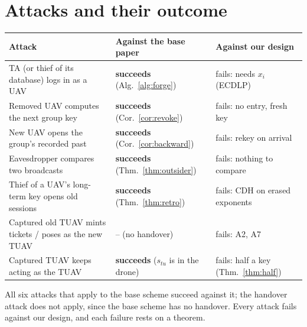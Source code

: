 \section{Attacks and their outcome}
\begin{center}
\small
\begin{tabularx}{\linewidth}{@{}X l l@{}}
\toprule
\textbf{Attack} & \textbf{Against the base paper} & \textbf{Against our design}\\
\midrule
TA (or thief of its database) logs in as a UAV & \textcolor{bad}{\textbf{succeeds}} (Alg.~\ref{alg:forge}) & fails: needs $x_i$ (ECDLP)\\
Removed UAV computes the next group key & \textbf{succeeds} (Cor.~\ref{cor:revoke}) & fails: no entry, fresh key\\
New UAV opens the group's recorded past & \textbf{succeeds} (Cor.~\ref{cor:backward}) & fails: rekey on arrival\\
Eavesdropper compares two broadcasts & \textcolor{bad}{\textbf{succeeds}} (Thm.~\ref{thm:outsider}) & fails: nothing to compare\\
Thief of a UAV's long-term key opens old sessions & \textcolor{bad}{\textbf{succeeds}} (Thm.~\ref{thm:retro}) & fails: CDH on erased exponents\\
Captured old TUAV mints tickets / poses as the new TUAV & -- (no handover) & fails: A2, A7\\
Captured TUAV keeps acting as the TUAV & \textcolor{bad}{\textbf{succeeds}} ($s_{tu}$ is in the drone) & fails: half a key (Thm.~\ref{thm:half})\\
\bottomrule
\end{tabularx}
\end{center}
All six attacks that apply to the base scheme succeed against it; the handover attack does not apply, since the base scheme has no handover. Every
attack fails against our design, and each failure rests on a theorem.

